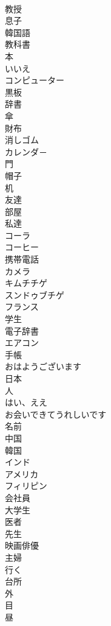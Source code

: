 \documentclass[8pt]{extreport}
\begin{document}
\begin{CJK}{UTF8}{min}
\\	教授
\\	息子
\\	韓国語
\\	教科書
\\	本
\\	いいえ
\\	コンピューター
\\	黒板
\\	辞書
\\	傘
\\	財布
\\	消しゴム
\\	カレンダ－
\\	門
\\	帽子
\\	机
\\	友達
\\	部屋
\\	私達
\\	コーラ
\\	コーヒー
\\	携帯電話
\\	カメラ
\\	キムチチゲ
\\	スンドゥブチゲ
\\	フランス
\\	学生
\\	電子辞書
\\	エアコン
\\	手帳
\\	おはようございます
\\	日本
\\	人
\\	はい、ええ
\\	お会いできてうれしいです
\\	名前
\\	中国
\\	韓国
\\	インド
\\	アメリカ
\\	フィリピン
\\	会社員
\\	大学生
\\	医者
\\	先生
\\	映画俳優
\\	主婦
\\	行く
\\	台所
\\	外
\\	目
\\	昼

\end{CJK}
\end{document}
